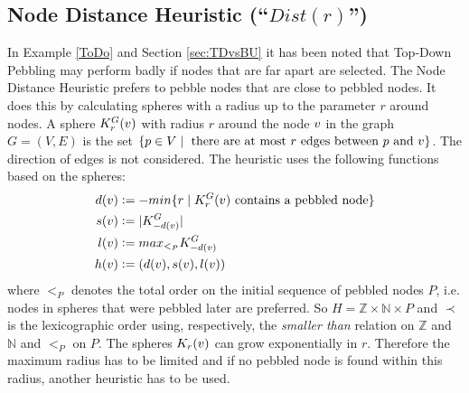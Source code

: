 \documentclass{llncs}
\newcommand{\defeq}{\mathrel{\mathop:}=}
\begin{document}
\subsection{Node Distance Heuristic (``$Dist(r)$'')}
\label{sec:distance}

In Example \ref{ToDo} and Section \ref{sec:TDvsBU} it has been noted that Top-Down Pebbling may perform badly if nodes that are far apart are selected. The Node Distance Heuristic prefers to pebble nodes that are close to pebbled nodes. It does this by calculating spheres with a radius up to the parameter $r$ around nodes.
A sphere $K_r^{G}(v)$ with radius $r$ around the node $v$ in the graph $G = (V,E)$ is the set $\{p \in V \mid \text{ there are at most } r \text{ edges between } p \text{ and } v\}$. The direction of edges is not considered. The heuristic uses the following functions based on the spheres:
\begin{align*}
d(\n) &\defeq -min\{r \mid K_r^{G}(\n)\text{ contains a pebbled node}\}\\
	s(\n) &\defeq |K_{-d(\n)}^G|\\
	l(\n) &\defeq max_{<_P}K_{-d(\n)}^G\\
	h(\n) &\defeq (d(\n),s(\n),l(\n))
\end{align*}
where $<_P$ denotes the total order on the initial sequence of pebbled nodes $P$, i.e. nodes in spheres that were pebbled later are preferred.
So $H = \mathbb{Z} \times \mathbb{N} \times P$ and $\prec$ is the lexicographic order using, respectively, the \emph{smaller than} relation on $\mathbb{Z}$ and $\mathbb{N}$ and $<_P$ on $P$. The spheres $K_r(v)$ can grow exponentially in $r$. Therefore the maximum radius has to be limited and if no pebbled node is found within this radius, another heuristic has to be used.
\end{document}
